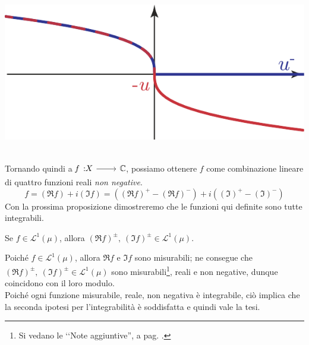 \begin{minipage}{0.5\textwidth}
	\begin{center}
		\includegraphics[trim=0cm 0cm 0cm 0cm, clip, scale=0.65]{images/partenegativa}
	\end{center}
\end{minipage}\vspace{4mm}\\
Tornando quindi a $\funz{f}{X}{\complexset}$, possiamo ottenere $f$ come combinazione lineare di quattro funzioni reali \textit{non negative}.
\begin{equation}
	f=\left(\Re f\right)+i\left(\Im f\right)=\left(\left(\Re f\right)^{+}-\left(\Re f\right)^{-}\right)+i\left(\left(\Im\right)^{+}-\left(\Im\right)^{-}\right)
\end{equation}
Con la prossima proposizione dimostreremo che le funzioni qui definite sono tutte integrabili.
\begin{proposition}\label{integrabilitàpartiposnegrealimm}
	Se $f\in\mathcal{L}^{1}\left(\mu\right)$, allora $\left(\Re f\right)^{\pm},\ \left(\Im f\right)^{\pm}\in\mathcal{L}^{1}\left(\mu\right)$.
\end{proposition}
\begin{demonstration}
	Poiché $f\in\mathcal{L}^{1}\left(\mu\right)$, allora $\Re f$ e $\Im f$ sono misurabili; ne consegue che $\left(\Re f\right)^{\pm},\ \left(\Im f\right)^{\pm}\in\mathcal{L}^{1}\left(\mu\right)$ sono misurabili\footnote{Si vedano le ‘‘Note aggiuntive'', a pag. \pageref{misuraparterealeimm}.}, reali e non negative, dunque coincidono con il loro modulo.\\
	Poiché ogni funzione misurabile, reale, non negativa è integrabile, ciò implica che la seconda ipotesi per l'integrabilità è soddisfatta e quindi vale la tesi.
\end{demonstration}
